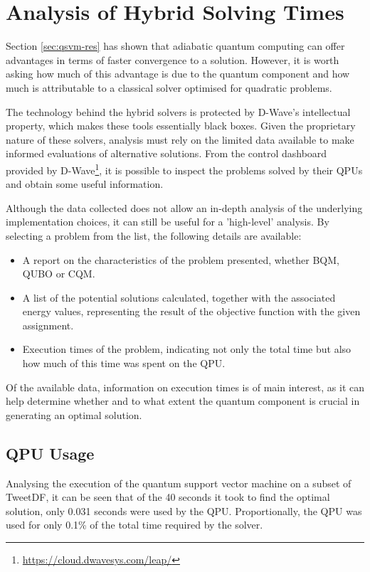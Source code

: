 \chapter{Analysis of Hybrid Solving Times}

Section \ref{sec:qsvm-res} has shown that adiabatic quantum computing can offer advantages in terms of faster convergence to a solution. However, it is worth asking how much of this advantage is due to the quantum component and how much is attributable to a classical solver optimised for quadratic problems.

The technology behind the hybrid solvers is protected by D-Wave's intellectual property, which makes these tools essentially black boxes. Given the proprietary nature of these solvers, analysis must rely on the limited data available to make informed evaluations of alternative solutions.
From the control dashboard provided by D-Wave\footnote{\url{https://cloud.dwavesys.com/leap/}}, it is possible to inspect the problems solved by their QPUs and obtain some useful information.

Although the data collected does not allow an in-depth analysis of the underlying implementation choices, it can still be useful for a 'high-level' analysis. By selecting a problem from the list, the following details are available: 
\begin{itemize} 
	\item A report on the characteristics of the problem presented, whether BQM, QUBO or CQM. 
	\item A list of the potential solutions calculated, together with the associated energy values, representing the result of the objective function with the given assignment. 
	\item Execution times of the problem, indicating not only the total time but also how much of this time was spent on the QPU. 
\end{itemize}

Of the available data, information on execution times is of main interest, as it can help determine whether and to what extent the quantum component is crucial in generating an optimal solution.

\section{QPU Usage}

Analysing the execution of the quantum support vector machine on a subset of TweetDF, it can be seen that of the 40 seconds it took to find the optimal solution, only 0.031 seconds were used by the QPU. Proportionally, the QPU was used for only 0.1\% of the total time required by the solver.

